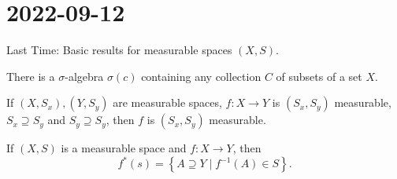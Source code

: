 \section{2022-09-12}

Last Time: Basic results for measurable spaces $(X, S)$.

\begin{theorem}
  There is a $\sigma$-algebra $\sigma(c)$ containing any collection $C$ of subsets of a set $X$.
\end{theorem}

\begin{lemma}
	If $(X,S_x), (Y,S_y)$ are measurable spaces, $f: X \to Y$ is $(S_x, S_y)$ measurable, $S_x \supseteq S_y$ and $S_y\supseteq S_y$, then $f$ is $(S_x, S_y)$ measurable.
\end{lemma}

\begin{theorem}
  If $(X, S)$ is a measurable space and $f: X \to Y$, then 
	\[
		f^*(s) = \left\{A \supseteq Y \mid f^{-1}(A) \in S \right\}.
	\]
\end{theorem}



